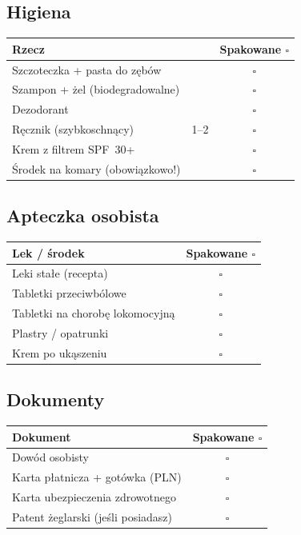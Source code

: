 \documentclass[a4paper,11pt]{article}
\begin{document}
\vspace{0.3cm}

\subsection*{Higiena}
\begin{tabularx}{\linewidth}{|X|c|c|}
\hline
\textbf{Rzecz} & & \textbf{Spakowane \(\square\)} \\
\hline
Szczoteczka + pasta do zębów & & \(\square\) \\[4pt]\hline
Szampon + żel (biodegradowalne) & & \(\square\) \\[4pt]\hline
Dezodorant & & \(\square\) \\[4pt]\hline
Ręcznik (szybkoschnący) & 1--2 & \(\square\) \\[4pt]\hline
Krem z filtrem SPF~30+ & & \(\square\) \\[4pt]\hline
Środek na komary (obowiązkowo!) & & \(\square\) \\[4pt]\hline
\end{tabularx}

\vspace{0.3cm}

\subsection*{Apteczka osobista}
\begin{tabularx}{\linewidth}{|X|c|}
\hline
\textbf{Lek / środek} & \textbf{Spakowane \(\square\)} \\
\hline
Leki stałe (recepta) & \(\square\) \\[4pt]\hline
Tabletki przeciwbólowe & \(\square\) \\[4pt]\hline
Tabletki na chorobę lokomocyjną & \(\square\) \\[4pt]\hline
Plastry / opatrunki & \(\square\) \\[4pt]\hline
Krem po ukąszeniu & \(\square\) \\[4pt]\hline
\end{tabularx}

\vspace{0.3cm}

\subsection*{Dokumenty}
\begin{tabularx}{\linewidth}{|X|c|}
\hline
\textbf{Dokument} & \textbf{Spakowane \(\square\)} \\
\hline
Dowód osobisty & \(\square\) \\[4pt]\hline
Karta płatnicza + gotówka (PLN) & \(\square\) \\[4pt]\hline
Karta ubezpieczenia zdrowotnego & \(\square\) \\[4pt]\hline
Patent żeglarski (jeśli posiadasz) & \(\square\) \\[4pt]\hline
\end{tabularx}
\end{document}
